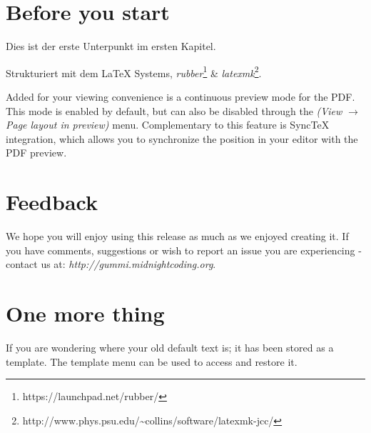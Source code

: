 \section{Before you start}

Dies ist der erste Unterpunkt im ersten Kapitel.

Strukturiert mit dem {\LaTeX} Systems, \emph{rubber}\footnote{https://launchpad.net/rubber/} \& \emph{latexmk}\footnote{http://www.phys.psu.edu/{\textasciitilde}collins/software/latexmk-jcc/}. 

Added for your viewing convenience is a continuous preview mode for the PDF. This mode is enabled by default, but can also be disabled through the \emph{(View $\rightarrow$ Page layout in preview)} menu. Complementary to this feature is SyncTeX integration, which allows you to synchronize the position in your editor with the PDF preview. 

\section{Feedback}
We hope you will enjoy using this release as much as we enjoyed creating it. If you have comments, suggestions or wish to report an issue you are experiencing - contact us at: \emph{http://gummi.midnightcoding.org}.

\section{One more thing}
If you are wondering where your old default text is; it has been stored as a template. The template menu can be used to access and restore it. 